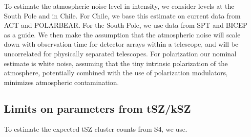 To estimate the atmospheric noise level in intensity, we consider levels at the South Pole and in Chile. For Chile, we base this estimate on current data from ACT and POLARBEAR. For the South Pole, we use data from SPT and BICEP as a guide. We then make the assumption that the atmospheric noise will scale down with observation time for detector arrays within a telescope, and will be uncorrelated for physically separated telescopes. For polarization our nominal estimate is white noise, assuming that the tiny intrinsic polarization of the atmosphere, potentially combined with the use of polarization modulators, minimizes atmospheric contamination.

%

\subsection{Limits on parameters from tSZ/kSZ}

To estimate the expected tSZ cluster counts from S4, we use.
